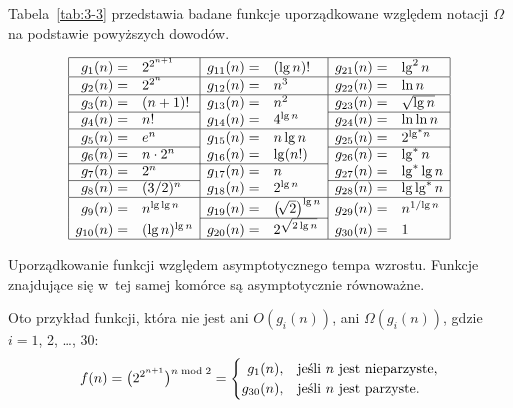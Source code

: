 Tabela~\ref{tab:3-3} przedstawia badane funkcje uporządkowane względem notacji $\Omega$ na podstawie powyższych dowodów.
\begin{table}[!ht]
	\renewcommand*{\arraystretch}{1.4}
	\centering
	\[
		\begin{array}{|rl|rl|rl|} \hline
		g_1(n)= & 2^{2^{n+1}} & g_{11}(n)= & (\lg n)! & g_{21}(n)= & \lg^2n \\ \hline
		g_2(n)= & 2^{2^n} & g_{12}(n)= & n^3 & g_{22}(n)= & \ln n \\ \hline
		g_3(n)= & (n+1)! & g_{13}(n)= & n^2 & g_{23}(n)= & \sqrt{\lg n} \\ \cline{1-2}\cline{5-6}
		g_4(n)= & n! & g_{14}(n)= & 4^{\lg n} & g_{24}(n)= & \ln\ln n \\ \hline
		g_5(n)= & e^n & g_{15}(n)= & n\lg n & g_{25}(n)= & 2^{\lg^*\!n} \\ \cline{1-2}\cline{5-6}
		g_6(n)= & n\cdot2^n & g_{16}(n)= & \lg(n!) & g_{26}(n)= & \lg^*n \\ \cline{1-4}
		g_7(n)= & 2^n & g_{17}(n)= & n & g_{27}(n)= & \lg^*\lg n \\ \cline{1-2}\cline{5-6}
		g_8(n)= & (3/2)^n & g_{18}(n)= & 2^{\lg n} & g_{28}(n)= & \lg\lg^*n \\ \hline
		g_9(n)= & n^{\lg\lg n} & g_{19}(n)= & \bigl(\!\sqrt{2}\bigr)^{\lg n} & g_{29}(n)= & n^{1/\!\lg n} \\ \cline{3-4}
		g_{10}(n)= & (\lg n)^{\lg n} & g_{20}(n)= & 2^{\sqrt{2\lg n}} & g_{30}(n)= & 1 \\ \hline
		\end{array}
	\]
	\caption{Uporządkowanie funkcji względem asymptotycznego tempa wzrostu.
	Funkcje znajdujące się w~tej samej komórce są asymptotycznie równoważne.} \label{tab:3-3}
\end{table}

\subproblem %
Oto przykład funkcji, która nie jest ani $O(g_i(n))$, ani $\Omega(g_i(n))$, gdzie $i=1$, 2, \dots, 30:
\[
	f(n) = \bigl(2^{2^{n+1}}\bigr)^{n\bmod2} =
	\begin{cases}
		\hfill g_1(n), & \text{jeśli $n$ jest nieparzyste}, \\
		g_{30}(n), & \text{jeśli $n$ jest parzyste}.
	\end{cases}
\]
